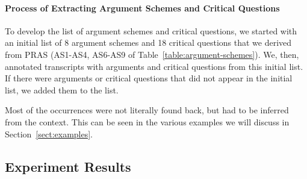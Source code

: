 \paragraph{Process of Extracting Argument Schemes and Critical Questions} 

To develop the list of argument schemes and critical questions, we started with an initial list of 8 argument schemes and 18 critical questions that we derived from PRAS (AS1-AS4, AS6-AS9 of Table~\ref{table:argument-schemes}). We, then, annotated transcripts with arguments and critical questions from this initial list. If there were arguments or critical questions that did not appear in the initial list, we added them to the list.

Most of the occurrences were not literally found back, but had to be inferred from the context. This can be seen in the various examples we will discuss in Section~\ref{sect:examples}.


\subsection{Experiment Results}

